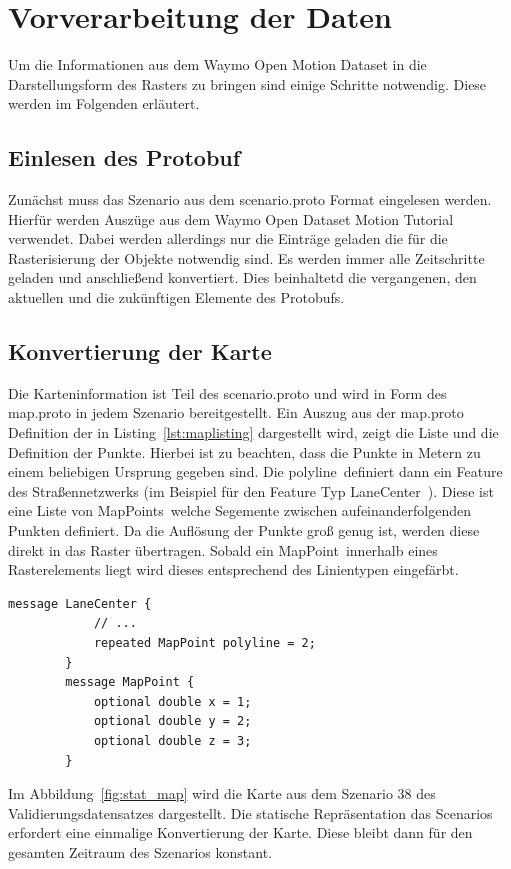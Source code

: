 \documentclass[12pt]{article}
\begin{document}
\section{Vorverarbeitung der Daten}
\label{sec:preprocessing}
    Um die Informationen aus dem Waymo Open Motion Dataset in die Darstellungsform des Rasters zu bringen 
    sind einige Schritte notwendig. Diese werden im Folgenden erläutert. 
    \subsection{Einlesen des Protobuf} 
        Zunächst muss das Szenario aus dem scenario.proto Format eingelesen werden. 
        Hierfür werden Auszüge aus dem Waymo Open Dataset Motion Tutorial~\cite{Tutorial2021} verwendet. 
        Dabei werden allerdings nur die Einträge geladen die für die Rasterisierung der Objekte notwendig sind. 
        Es werden immer alle Zeitschritte geladen und anschließend konvertiert. 
        Dies beinhaltetd die vergangenen, den aktuellen und die zukünftigen Elemente des Protobufs.

    \subsection{Konvertierung der Karte}
        Die Karteninformation ist Teil des scenario.proto und wird in Form des map.proto in jedem Szenario bereitgestellt.
        Ein Auszug aus der map.proto Definition der in Listing~\ref{lst:maplisting} dargestellt wird, zeigt die Liste und die Definition der Punkte. 
        Hierbei ist zu beachten, dass die Punkte in Metern zu einem beliebigen Ursprung gegeben sind. 
        Die \grqq polyline\grqq~definiert dann ein Feature des Straßennetzwerks (im Beispiel für den Feature Typ \grqq LaneCenter\grqq~). 
        Diese ist eine Liste von \grqq MapPoints\grqq~welche Segemente zwischen aufeinanderfolgenden Punkten definiert.
        Da die Auflösung der Punkte groß genug ist, werden diese direkt in das Raster übertragen. 
        Sobald ein \grqq MapPoint\grqq~innerhalb eines Rasterelements liegt wird dieses entsprechend des Linientypen eingefärbt.
        \vspace{0.5cm}
        \begin{lstlisting}[language=protobuf2, caption=Auszug aus map.proto, label={lst:maplisting}]
        message LaneCenter {
            // ...
            repeated MapPoint polyline = 2;
        }
        message MapPoint {
            optional double x = 1;
            optional double y = 2;
            optional double z = 3;
        }
        \end{lstlisting}
        Im Abbildung~\ref{fig:stat_map} wird die Karte aus dem Szenario 38 des Validierungsdatensatzes dargestellt. 
        Die statische Repräsentation das Scenarios erfordert eine einmalige Konvertierung der Karte. 
        Diese bleibt dann für den gesamten Zeitraum des Szenarios konstant.
\end{document}
